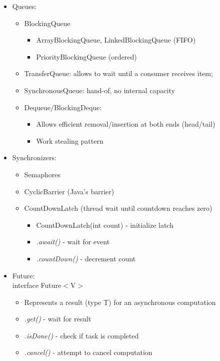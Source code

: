 \documentclass[a4paper]{article}
\begin{document}
\begin{itemize}
\begin{itemize}
\begin{itemize}
\end{itemize}
\end{itemize}
\item Queues: 
\begin{itemize}
\item BlockingQueue
\begin{itemize}
\item ArrayBlockingQueue, LinkedBlockingQueue (FIFO)
\item PriorityBlockingQueue (ordered)
\end{itemize}
\item TransferQueue: allows to wait until a consumer receives item; 
\item SynchronousQueue: hand-of, no internal capacity 
\item Dequeue/BlockingDeque: 
\begin{itemize}
\item Allows efficient removal/insertion at both ends (head/tail)
\item Work stealing pattern
\end{itemize}
\end{itemize}
\item Synchronizers: 
\begin{itemize}
\item Semaphores
\item CyclicBarrier (Java's barrier)
\item CountDownLatch (thread wait until countdown reaches zero)
\begin{itemize}
\item CountDownLatch(int count) - initialize latch
\item \textsl{.await()} - wait for event
\item \textsl{.countDown()} - decrement count
\end{itemize}
\end{itemize}
\item Future: \\
interface Future$<$V$>$
\begin{itemize}
\item Represents a result (type T) for an asynchronous computation
\item \textsl{.get()} - wait for result
\item \textsl{.isDone()} - check if task is completed
\item \textsl{.cancel()} - attempt to cancel computation
\end{itemize}
\end{itemize}
\end{document}
